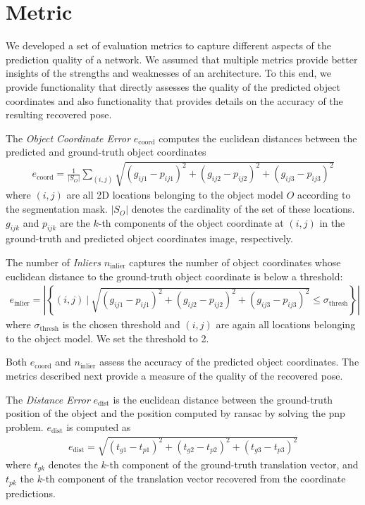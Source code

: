 \section{Metric}

We developed a set of evaluation metrics to capture different aspects of the prediction quality of a network. We assumed that multiple metrics provide better insights of the strengths and weaknesses of an architecture. To this end, we provide functionality that directly assesses the quality of the predicted object coordinates and also functionality that provides details on the accuracy of the resulting recovered pose.

The \textit{Object Coordinate Error} $e_{\text{coord}}$ computes the euclidean distances between the predicted and ground-truth object coordinates
\begin{align*}
e_{\text{coord}} = \frac{1}{|S_O|} \sum\limits_{(i, j)} \sqrt{(g_{ij1} - p_{ij1})^2 +(g_{ij2} - p_{ij2})^2 + (g_{ij3} - p_{ij3})^2}
\end{align*}
where $(i, j)$ are all 2D locations belonging to the object model $O$ according to the segmentation mask. $|S_O|$ denotes the cardinality of the set of these locations. $g_{ijk}$ and $p_{ijk}$ are the $k$-th components of the object coordinate at $(i, j)$ in the ground-truth and predicted object coordinates image, respectively.

The number of \textit{Inliers} $n_{\text{inlier}}$ captures the number of object coordinates whose euclidean distance to the ground-truth object coordinate is below a threshold:
\begin{align*}
e_{\text{inlier}} = \left\rvert\left\lbrace(i,j) \ \bigg| \ \sqrt{(g_{ij1} - p_{ij1})^2 +(g_{ij2} - p_{ij2})^2 + (g_{ij3} - p_{ij3})^2} \leq \sigma_{\text{thresh}}\right\rbrace \right\rvert
\end{align*}
where $\sigma_{\text{thresh}}$ is the chosen threshold and $(i,j)$ are again all locations belonging to the object model. We set the threshold to 2.

Both $e_{\text{coord}}$ and $n_{\text{inlier}}$ assess the accuracy of the predicted object coordinates. The metrics described next provide a measure of the quality of the recovered pose.

The \textit{Distance Error} $e_{\text{dist}}$ is the euclidean distance between the ground-truth position of the object and the position computed by \ac{ransac} by solving the \ac{pnp} problem. $e_{\text{dist}}$ is computed as
\begin{align*}
e_{\text{dist}} = \sqrt{(t_{g1} - t_{p1})^2 +(t_{g2} - t_{p2})^2 + (t_{g3} - t_{p3})^2}
\end{align*}
where $t_{gk}$ denotes the $k$-th component of the ground-truth translation vector, and $t_{pk}$ the $k$-th component of the translation vector recovered from the coordinate predictions.

